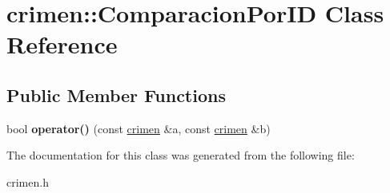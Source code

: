 \hypertarget{classcrimen_1_1ComparacionPorID}{}\section{crimen\+:\+:Comparacion\+Por\+I\+D Class Reference}
\label{classcrimen_1_1ComparacionPorID}
\subsection*{Public Member Functions}
\begin{DoxyCompactItemize}
\item 
\hypertarget{classcrimen_1_1ComparacionPorID_a4c3122bb2780ea6a1cccf1ea5980db28}{}bool {\bfseries operator()} (const \hyperlink{classcrimen}{crimen} \&a, const \hyperlink{classcrimen}{crimen} \&b)\label{classcrimen_1_1ComparacionPorID_a4c3122bb2780ea6a1cccf1ea5980db28}

\end{DoxyCompactItemize}


The documentation for this class was generated from the following file\+:\begin{DoxyCompactItemize}
\item 
crimen.\+h\end{DoxyCompactItemize}
